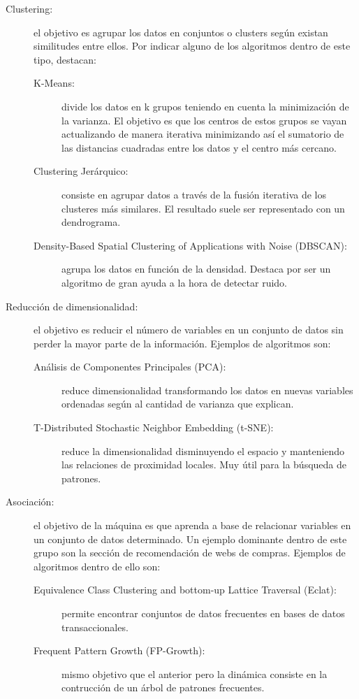 	\begin{description}
		\item[Clustering:] el objetivo es agrupar los datos en conjuntos o clusters según existan similitudes entre ellos. Por indicar alguno de los algoritmos dentro de este tipo, destacan:
			\begin{description}
				\item [K-Means:] divide los datos en k grupos teniendo en cuenta la minimización de la varianza. El objetivo es que los centros de estos grupos se vayan actualizando de manera iterativa minimizando así el sumatorio de las distancias cuadradas entre los datos y el centro más cercano.
				\item [Clustering Jerárquico:] consiste en agrupar datos a través de la fusión iterativa de los clusteres más similares. El resultado suele ser representado con un dendrograma.
				\item [Density-Based Spatial Clustering of Applications with Noise (DBSCAN):] agrupa los datos en función de la densidad. Destaca por ser un algoritmo de gran ayuda a la hora de detectar ruido.
			\end{description}
		\item[Reducción de dimensionalidad:] el objetivo es reducir el número de variables en un conjunto de datos sin perder la mayor parte de la información. Ejemplos de algoritmos son:
			\begin{description}
				\item [Análisis de Componentes Principales (PCA):] reduce dimensionalidad transformando los datos en nuevas variables ordenadas según al cantidad de varianza que explican.
				\item [T-Distributed Stochastic Neighbor Embedding (t-SNE):] reduce la dimensionalidad disminuyendo el espacio y manteniendo las relaciones de proximidad locales. Muy útil para la búsqueda de patrones.
			\end{description}
		\item[Asociación:] el objetivo de la máquina es que aprenda a base de relacionar variables en un conjunto de datos determinado. Un ejemplo dominante dentro de este grupo son la sección de recomendación de webs de compras. Ejemplos de algoritmos dentro de ello son:
			\begin{description}
				\item [Equivalence Class Clustering and bottom-up Lattice Traversal (Eclat):] permite encontrar conjuntos de datos frecuentes en bases de datos transaccionales.
				\item [Frequent Pattern Growth (FP-Growth):] mismo objetivo que el anterior pero la dinámica consiste en la contrucción de un árbol de patrones frecuentes.
			\end{description}
	\end{description}

